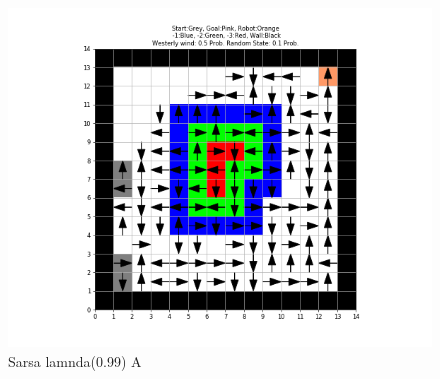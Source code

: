 \documentclass[12pt, letterpaper, twoside]{report}
\begin{document}
  \begin{figure}[b]
    \includegraphics[width=\linewidth]{Sarsa_Problem_A_lambda_099.png}
    \caption{Sarsa lamnda(0.99) A}
  \end{figure}
  \label{fig:Softamx}
  
  
  
\end{document}
